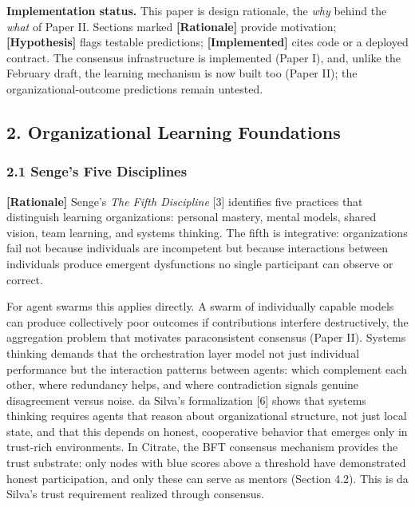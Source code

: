 \textbf{Implementation status.} This paper is design rationale, the
\emph{why} behind the \emph{what} of Paper II. Sections marked
\textbf{{[}Rationale{]}} provide motivation; \textbf{{[}Hypothesis{]}}
flags testable predictions; \textbf{{[}Implemented{]}} cites code or a
deployed contract. The consensus infrastructure is implemented (Paper
I), and, unlike the February draft, the learning mechanism is now built
too (Paper II); the organizational-outcome predictions remain untested.

\subsection{2. Organizational Learning
Foundations}\label{organizational-learning-foundations}

\subsubsection{2.1 Senge's Five
Disciplines}\label{senges-five-disciplines}

\textbf{{[}Rationale{]}} Senge's \emph{The Fifth Discipline} {[}3{]}
identifies five practices that distinguish learning organizations:
personal mastery, mental models, shared vision, team learning, and
systems thinking. The fifth is integrative: organizations fail not
because individuals are incompetent but because interactions between
individuals produce emergent dysfunctions no single participant can
observe or correct.

For agent swarms this applies directly. A swarm of individually capable
models can produce collectively poor outcomes if contributions interfere
destructively, the aggregation problem that motivates paraconsistent
consensus (Paper II). Systems thinking demands that the orchestration
layer model not just individual performance but the interaction patterns
between agents: which complement each other, where redundancy helps, and
where contradiction signals genuine disagreement versus noise. da
Silva's formalization {[}6{]} shows that systems thinking requires
agents that reason about organizational structure, not just local state,
and that this depends on honest, cooperative behavior that emerges only
in trust-rich environments. In Citrate, the BFT consensus mechanism
provides the trust substrate: only nodes with blue scores above a
threshold have demonstrated honest participation, and only these can
serve as mentors (Section 4.2). This is da Silva's trust requirement
realized through consensus.

